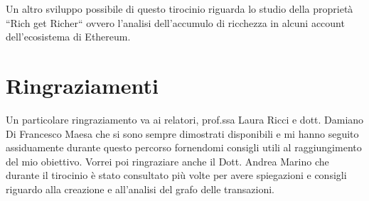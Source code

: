 \documentclass[12pt]{report}
\begin{document}
Un altro sviluppo possibile di questo tirocinio riguarda lo studio della proprietà ``Rich get Richer`` ovvero l'analisi dell'accumulo di ricchezza in alcuni account dell'ecosistema di Ethereum.


\chapter{Ringraziamenti}

Un particolare ringraziamento va ai relatori, prof.ssa Laura Ricci e dott. Damiano Di Francesco Maesa che si sono sempre dimostrati disponibili e mi hanno seguito assiduamente durante questo percorso fornendomi consigli utili al raggiungimento del mio obiettivo.
\newline 
Vorrei poi ringraziare anche il Dott. Andrea Marino che durante il tirocinio è stato consultato più volte per avere spiegazioni e consigli riguardo alla creazione e all'analisi del grafo delle transazioni.

\appendix




\end{document}
